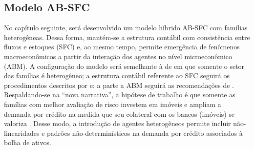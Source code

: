 \subsection{Modelo AB-SFC}

No capítulo seguinte, será desenvolvido  um modelo híbrido AB-SFC com famílias heterogêneas.
Dessa forma, mantém-se a estrutura contábil com consistência entre fluxos e estoques (SFC) e, ao mesmo tempo, permite  emergência de fenômenos macroeconômicos a partir da interação dos agentes no nível microeconômico (ABM).
A configuração do modelo será semelhante à de \textcite{carvalho_income_2014} em que somente o setor das famílias é heterogêneo; a estrutura contábil referente ao SFC seguirá os procedimentos descritos por \textcite{dos_santos_simplified_2007} %
e; a parte a ABM seguirá as recomendações de \textcite{caiani_agent_2016}.
Respaldando-se na ``nova narrativa'', a hipótese de trabalho é que somente as famílias com melhor avaliação de risco investem em imóveis e ampliam a demanda por crédito na medida que seu colateral com os bancos (imóveis) se valoriza \cite{albanesi_credit_2017}.
Desse modo, a introdução de agentes heterogêneos permite incluir não-linearidades e padrões não-determinísticos na demanda por crédito associados à bolha de ativos.

